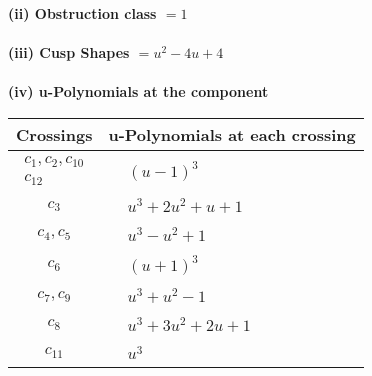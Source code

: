 \documentclass[1p]{elsarticle_modified}
\theoremstyle{definition}
\begin{document}
\flushleft \textbf{(ii) Obstruction class $= 1$}\\~\\
\flushleft \textbf{(iii) Cusp Shapes $= u^2-4 u+4$}\\~\\
\newpage\renewcommand{\arraystretch}{1}
\flushleft \textbf{(iv) u-Polynomials at the component}\newline \\
\begin{tabular}{m{50pt}|m{274pt}}
Crossings & \hspace{64pt}u-Polynomials at each crossing \\
\hline $$\begin{aligned}c_{1},c_{2},c_{10}\\c_{12}\end{aligned}$$&$\begin{aligned}
&(u-1)^3
\end{aligned}$\\
\hline $$\begin{aligned}c_{3}\end{aligned}$$&$\begin{aligned}
&u^3+2 u^2+u+1
\end{aligned}$\\
\hline $$\begin{aligned}c_{4},c_{5}\end{aligned}$$&$\begin{aligned}
&u^3- u^2+1
\end{aligned}$\\
\hline $$\begin{aligned}c_{6}\end{aligned}$$&$\begin{aligned}
&(u+1)^3
\end{aligned}$\\
\hline $$\begin{aligned}c_{7},c_{9}\end{aligned}$$&$\begin{aligned}
&u^3+u^2-1
\end{aligned}$\\
\hline $$\begin{aligned}c_{8}\end{aligned}$$&$\begin{aligned}
&u^3+3 u^2+2 u+1
\end{aligned}$\\
\hline $$\begin{aligned}c_{11}\end{aligned}$$&$\begin{aligned}
&u^3
\end{aligned}$\\
\hline
\end{tabular}\\~\\
\end{document}
